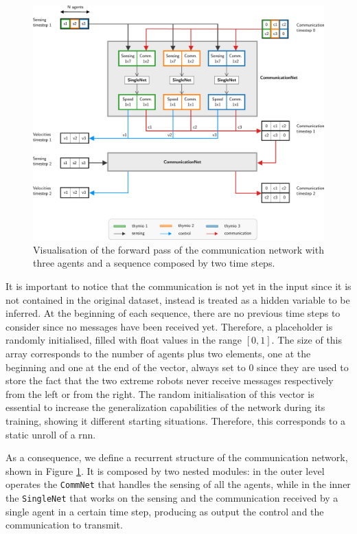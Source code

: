 \begin{figure}[!htb]
	\centering
	\includegraphics[width=\textwidth]{contents/images/commnet2}
	\caption[Communication network.]{Visualisation of the forward pass of the 
		communication network with three agents and a sequence composed by two 
		time steps.}
	\label{fig:commnet1}
\end{figure}

It is important to notice that the communication is not yet in the input since 
it is not contained in the original dataset, instead is treated as a hidden 
variable to be inferred. 
At the beginning of each sequence, there are no previous time steps to consider 
since no messages have been received yet. Therefore, a placeholder is randomly 
initialised, filled with float values in the range $[0, 1]$. 
The size of this array corresponds to the number of agents plus two elements, one 
at the beginning and one at the end of the vector, always set to $0$ since they are 
used to store the fact that the two extreme robots never receive messages 
respectively from the left or from the right. 
The random initialisation of this vector is essential to increase the generalization 
capabilities of the network during its training, showing it different starting 
situations.
Therefore, this corresponds to a static unroll of a \gls{rnn}.%

As a consequence, we define a recurrent structure of the communication 
network, shown in Figure \ref{fig:commnet1}.
It is composed by two nested modules: in the outer level operates the 
\texttt{CommNet} that handles the sensing of all the agents, while in the inner the 
\texttt{SingleNet} that works on the sensing and the communication received by a 
single agent in a certain time step, producing as output the control and the 
communication to transmit. 

